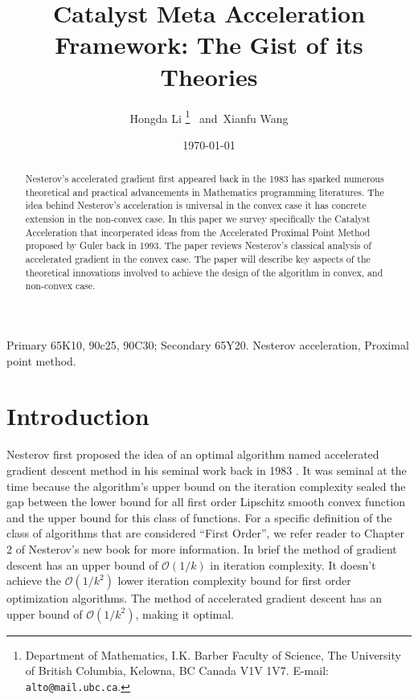 \documentclass[12pt]{article}
\begin{document}
\title{
    {
        \selectfont 
        Catalyst Meta Acceleration Framework: The Gist of its Theories
    }
    }

\author{
    Hongda Li
    \thanks{Department of Mathematics, I.K. Barber Faculty of Science,
    The University of British Columbia, Kelowna, BC Canada V1V 1V7. E-mail:  \texttt{alto@mail.ubc.ca}.}~ and~Xianfu Wang
}

\date{\today}

\maketitle


\begin{abstract} 
    \noindent
    Nesterov's accelerated gradient first appeared back in the 1983 has sparked numerous theoretical and practical advancements in Mathematics programming literatures. 
    The idea behind Nesterov's acceleration is universal in the convex case it has concrete extension in the non-convex case. 
    In this paper we survey specifically the Catalyst Acceleration that incorperated ideas from the Accelerated Proximal Point Method proposed by Guler back in 1993. 
    The paper reviews Nesterov's classical analysis of accelerated gradient in the convex case.
    The paper will describe key aspects of the theoretical innovations involved to achieve the design of the algorithm in convex, and non-convex case. 
    
\end{abstract}

Primary 65K10, 90c25, 90C30; Secondary 65Y20. 
 Nesterov acceleration, Proximal point method. 

\section{Introduction}
    Nesterov first proposed the idea of an optimal algorithm named accelerated gradient descent method in his seminal work back in 1983 \cite{nesterov_method_1983}. 
    It was seminal at the time because the algorithm's upper bound on the iteration complexity sealed the gap between the lower bound for all first order Lipschitz smooth convex function and the upper bound for this class of functions. 
    For a specific definition of the class of algorithms that are considered ``First Order'', we refer reader to Chapter 2 of Nesterov's new book \cite{nesterov_lecture_2018} for more information. 
    In brief the method of gradient descent has an upper bound of $\mathcal O(1/k)$ in iteration complexity. 
    It doesn't achieve the $\mathcal O(1/k^2)$ lower iteration complexity bound for first order optimization algorithms.
    The method of accelerated gradient descent has an upper bound of $\mathcal O(1/k^2)$, making it optimal. 
\end{document}
